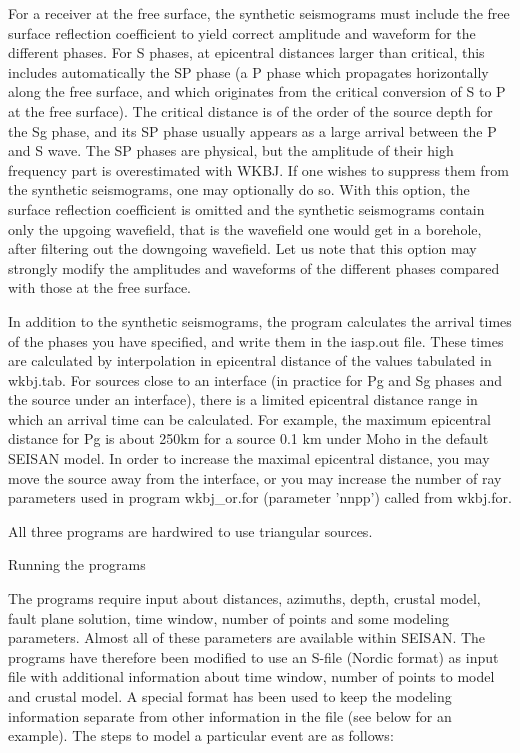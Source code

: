 For a receiver at the free surface, the synthetic seismograms must include the free surface reflection coefficient to yield correct amplitude and waveform for the different phases. For S phases, at epicentral distances larger than critical, this includes automatically the SP phase (a P phase which propagates horizontally along the free surface, and which originates from the critical conversion of S to P at the free surface). The critical distance is of the order of the source depth for the Sg phase, and its SP phase usually appears as a large arrival between the P and S wave. The SP phases are physical, but the amplitude of their high frequency part is overestimated with WKBJ. If one wishes to suppress them from the synthetic seismograms, one may optionally do so. With this option, the surface reflection coefficient is omitted and the synthetic seismograms contain only the upgoing wavefield, that is the wavefield one would get in a borehole, after filtering out the downgoing wavefield. Let us note that this option may strongly modify the amplitudes and waveforms of the different phases compared with those at the free surface. 

In addition to the synthetic seismograms, the program calculates the arrival times of the phases you have specified, and write them in the iasp.out file. These times are calculated by interpolation in epicentral distance of the values tabulated in wkbj.tab. For sources close to an interface (in practice for Pg and Sg phases and the source under an interface), there is a limited epicentral distance range in which an arrival time can be calculated. For example, the maximum epicentral distance for Pg is about 250km for a source 0.1 km under Moho in the default SEISAN model. In order to increase the maximal epicentral distance, you may move the source away from the interface, or you may increase the number of ray parameters used in program wkbj\_or.for (parameter 'nnpp') called from wkbj.for. 

All three programs are hardwired to use triangular sources. 

Running the programs 

The programs require input about distances, azimuths, depth, crustal model, fault plane solution, time window, number of points and some modeling parameters. Almost all of these parameters are available within SEISAN. The programs have therefore been modified to use an S-file (Nordic format) as input file with additional information about time window, number of points to model and crustal model. A special format has been used to keep the modeling information separate from other information in the file (see below for an example). The steps to model a particular event are as follows: 

